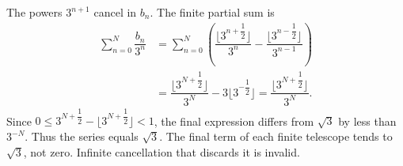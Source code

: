 The powers $3^{n+1}$ cancel in $b_n$. The finite partial sum is
\[
\begin{aligned}
\sum_{n=0}^N\dfrac{b_n}{3^n}
&=\sum_{n=0}^N\left(
\dfrac{\lfloor3^{n+\dfrac{1}{2}}\rfloor}{3^n}
-\dfrac{\lfloor3^{n-\dfrac{1}{2}}\rfloor}{3^{n-1}}\right)\\
&=\dfrac{\lfloor3^{N+\dfrac{1}{2}}\rfloor}{3^N}
-3\lfloor3^{-\dfrac{1}{2}}\rfloor
=\dfrac{\lfloor3^{N+\dfrac{1}{2}}\rfloor}{3^N}.
\end{aligned}
\]
Since $0\le3^{N+\dfrac{1}{2}}-\lfloor3^{N+\dfrac{1}{2}}\rfloor<1$, the final expression differs from $\sqrt3$ by less than $3^{-N}$. Thus the series equals $\boxed{\sqrt3}$.
The final term of each finite telescope tends to $\sqrt3$, not zero. Infinite cancellation that discards it is invalid.
